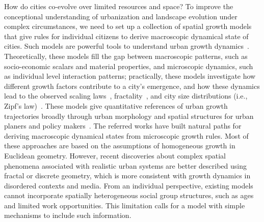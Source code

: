 How do cities co-evolve over limited resources and space? To improve the conceptional understanding of urbanization and landscape evolution under complex circumstances, we need to set up a collection of spatial growth models that give rules for individual citizens to derive macroscopic dynamical state of cities. Such models are powerful tools to understand urban growth dynamics~\cite{PhysRevX.4.011008, Li2017Simple, makse1995modelling, rybski2013distance, nanda2017spatial}. Theoretically, these models fill the gap between macroscopic patterns, such as socio-economic scalars and material properties, and microscopic dynamics, such as individual level interaction patterns; practically, these models investigate how different growth factors contribute to a city's emergence, and how these dynamics lead to the observed scaling laws~\cite{bettencourt2007growth,court2013origins,batty2008size,batty2019urbanscalinglaw}, fractality~\cite{batty1994fractal,batty2007cities}, and city size distributions (i.e., Zipf's law)~\cite{zipf1949human}. These models give quantitative references of urban growth trajectories broadly through urban morphology and spatial structures for urban planers and policy makers~\cite{anas1998urban}. The referred works have built natural paths for deriving macroscopic dynamical states from microscopic growth rules. Most of these approaches are based on the assumptions of homogeneous growth in Euclidean geometry. However, recent discoveries about complex spatial phenomena associated with realistic urban systems are better described using fractal or discrete geometry\cite{makse1995modelling,louf2014congestion,PhysRevE.58.7054}, which is more consistent with growth dynamics in disordered contexts and media. From an individual perspective, existing models cannot incorporate spatially heterogeneous social group structures, such as ages\cite{PhysRevE.93.012112} and limited work opportunities. This limitation calls for a model with simple mechanisms to include such information.

